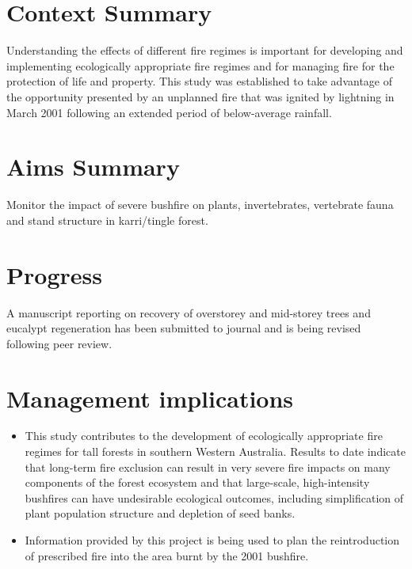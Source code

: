 \documentclass[version=last, paper=a4, DIV=18, usenames, dvipsnames]{scrartcl}
\begin{document}
\section{Context Summary}



Understanding the effects of different fire regimes is important for developing and implementing ecologically appropriate fire regimes and for managing fire for the protection of life and property. This study was established to take advantage of the opportunity presented by an unplanned fire that was ignited by lightning in March 2001 following an extended period of below-average rainfall.






\section{Aims Summary}



Monitor the impact of severe bushfire on plants, invertebrates, vertebrate fauna and stand structure in karri/tingle forest.






\section{Progress}



A manuscript reporting on recovery of overstorey and mid-storey trees and eucalypt regeneration has been submitted to journal and is being revised following peer review.






\section{Management implications}



\begin{itemize}

  \item This study contributes to the development of ecologically appropriate fire regimes for tall forests in southern Western Australia. Results to date indicate that long-term fire exclusion can result in very severe fire impacts on many components of the forest ecosystem and that large-scale, high-intensity bushfires can have undesirable ecological outcomes, including simplification of plant population structure and depletion of seed banks.

  \item Information provided by this project is being used to plan the reintroduction of prescribed fire into the area burnt by the 2001 bushfire.

\end{itemize}
\end{document}
